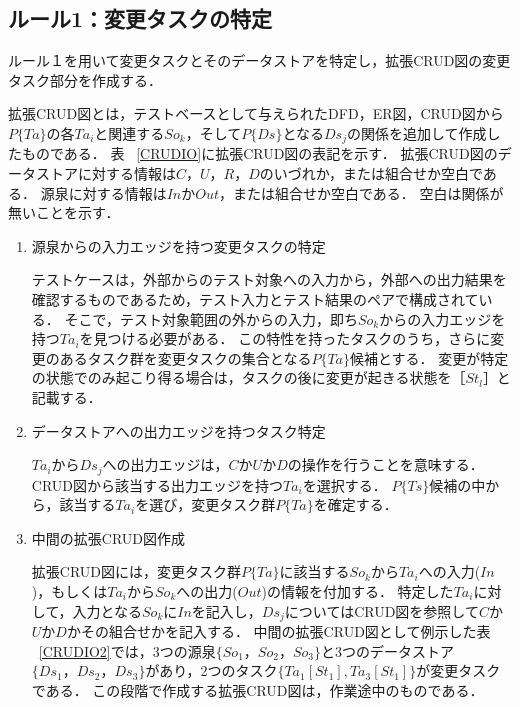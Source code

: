 \documentclass[a4paper,11pt]{jreport}
\begin{document}
\subsection{ルール1：変更タスクの特定}
ルール１を用いて変更タスクとそのデータストアを特定し，拡張CRUD図の変更タスク部分を作成する．

拡張CRUD図とは，テストベースとして与えられたDFD，ER図，CRUD図から$P\{Ta\}$の各$Ta_i$と関連する$So_k$，そして$P\{Ds\}$となる$Ds_j$の関係を追加して作成したものである．
表 ~\ref{CRUDIO}に拡張CRUD図の表記を示す．
拡張CRUD図のデータストアに対する情報は$C$，$U$，$R$，$D$のいづれか，または組合せか空白である．
源泉に対する情報は$In$か$Out$，または組合せか空白である．
空白は関係が無いことを示す．

\begin{enumerate}
\item 源泉からの入力エッジを持つ変更タスクの特定

テストケースは，外部からのテスト対象への入力から，外部への出力結果を確認するものであるため，テスト入力とテスト結果のペアで構成されている．
そこで，テスト対象範囲の外からの入力，即ち$So_k$からの入力エッジを持つ$Ta_i$を見つける必要がある．
この特性を持ったタスクのうち，さらに変更のあるタスク群を変更タスクの集合となる$P\{Ta\}$候補とする．
変更が特定の状態でのみ起こり得る場合は，タスクの後に変更が起きる状態を［$St_l$］と記載する．

\item データストアへの出力エッジを持つタスク特定

$Ta_i$から$Ds_j$への出力エッジは，$C$か$U$か$D$の操作を行うことを意味する．CRUD図から該当する出力エッジを持つ$Ta_i$を選択する．
$P\{Ts\}$候補の中から，該当する$Ta_i$を選び，変更タスク群$P\{Ta\}$を確定する．

\item 中間の拡張CRUD図作成

拡張CRUD図には，変更タスク群$P\{Ta\}$に該当する$So_k$から$Ta_i$への入力($In$)，もしくは$Ta_i$から$So_k$への出力($Out$)の情報を付加する．
特定した$Ta_i$に対して，入力となる$So_k$に$In$を記入し，$Ds_j$についてはCRUD図を参照して$C$か$U$か$D$かその組合せかを記入する．
中間の拡張CRUD図として例示した表 ~\ref{CRUDIO2}では，3つの源泉$\{So_1，So_2，So_3\}$と3つのデータストア$\{Ds_1，Ds_2，Ds_3\}$があり，2つのタスク$\{Ta_1[St_1],Ta_3[St_1]\}$が変更タスクである．
この段階で作成する拡張CRUD図は，作業途中のものである．

\end{enumerate}
\end{document}
